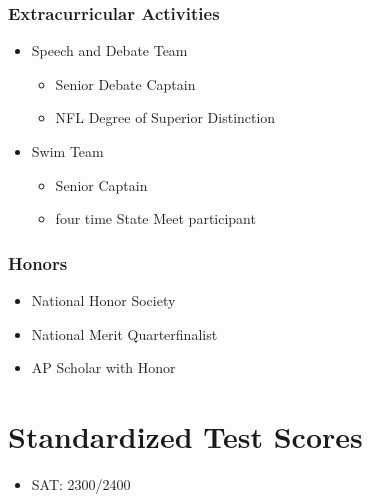 \documentclass[a4paper]{article}
\begin{document}
\subsubsection{Extracurricular Activities}

\begin{itemize}

    \item{Speech and Debate Team}
    \begin{itemize}
        \item{Senior Debate Captain}
        \item{NFL Degree of Superior Distinction}
    \end{itemize}

    \item{Swim Team}
    \begin{itemize}
        \item{Senior Captain}
        \item{four time State Meet participant}
    \end{itemize}

\end{itemize}





\subsubsection{Honors}

\begin{itemize}
    \item{National Honor Society}
    \item{National Merit Quarterfinalist}
    \item{AP Scholar with Honor}
\end{itemize}





\pagebreak
\section{Standardized Test Scores}

\begin{itemize}
    \item{SAT: 2300/2400}
\end{itemize}
\end{document}
